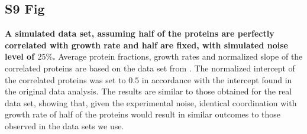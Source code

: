 \documentclass[10pt,letterpaper]{article}
\begin{document}
\subsection*{S9 Fig}
\label{fig:simulated}
    {\bf A simulated data set, assuming half of the proteins are perfectly correlated with growth rate and half are fixed, with simulated noise level of $25\%$.}
Average protein fractions, growth rates and normalized slope of the correlated proteins are based on the data set from \cite{Schmidt2015}.
The normalized intercept of the correlated proteins was set to $0.5$ in accordance with the intercept found in the original data analysis.
The results are similar to those obtained for the real data set, showing that, given the experimental noise, identical coordination with growth rate of half of the proteins would result in similar outcomes to those observed in the data sets we use.%
\end{document}
